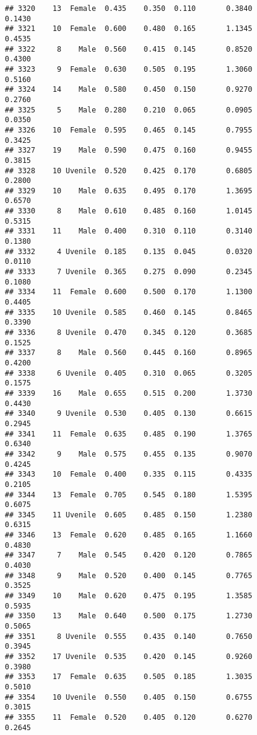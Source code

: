 \documentclass[
]{article}
\begin{document}
\begin{verbatim}
## 3320    13  Female  0.435    0.350  0.110       0.3840         0.1430
## 3321    10  Female  0.600    0.480  0.165       1.1345         0.4535
## 3322     8    Male  0.560    0.415  0.145       0.8520         0.4300
## 3323     9  Female  0.630    0.505  0.195       1.3060         0.5160
## 3324    14    Male  0.580    0.450  0.150       0.9270         0.2760
## 3325     5    Male  0.280    0.210  0.065       0.0905         0.0350
## 3326    10  Female  0.595    0.465  0.145       0.7955         0.3425
## 3327    19    Male  0.590    0.475  0.160       0.9455         0.3815
## 3328    10 Uvenile  0.520    0.425  0.170       0.6805         0.2800
## 3329    10    Male  0.635    0.495  0.170       1.3695         0.6570
## 3330     8    Male  0.610    0.485  0.160       1.0145         0.5315
## 3331    11    Male  0.400    0.310  0.110       0.3140         0.1380
## 3332     4 Uvenile  0.185    0.135  0.045       0.0320         0.0110
## 3333     7 Uvenile  0.365    0.275  0.090       0.2345         0.1080
## 3334    11  Female  0.600    0.500  0.170       1.1300         0.4405
## 3335    10 Uvenile  0.585    0.460  0.145       0.8465         0.3390
## 3336     8 Uvenile  0.470    0.345  0.120       0.3685         0.1525
## 3337     8    Male  0.560    0.445  0.160       0.8965         0.4200
## 3338     6 Uvenile  0.405    0.310  0.065       0.3205         0.1575
## 3339    16    Male  0.655    0.515  0.200       1.3730         0.4430
## 3340     9 Uvenile  0.530    0.405  0.130       0.6615         0.2945
## 3341    11  Female  0.635    0.485  0.190       1.3765         0.6340
## 3342     9    Male  0.575    0.455  0.135       0.9070         0.4245
## 3343    10  Female  0.400    0.335  0.115       0.4335         0.2105
## 3344    13  Female  0.705    0.545  0.180       1.5395         0.6075
## 3345    11 Uvenile  0.605    0.485  0.150       1.2380         0.6315
## 3346    13  Female  0.620    0.485  0.165       1.1660         0.4830
## 3347     7    Male  0.545    0.420  0.120       0.7865         0.4030
## 3348     9    Male  0.520    0.400  0.145       0.7765         0.3525
## 3349    10    Male  0.620    0.475  0.195       1.3585         0.5935
## 3350    13    Male  0.640    0.500  0.175       1.2730         0.5065
## 3351     8 Uvenile  0.555    0.435  0.140       0.7650         0.3945
## 3352    17 Uvenile  0.535    0.420  0.145       0.9260         0.3980
## 3353    17  Female  0.635    0.505  0.185       1.3035         0.5010
## 3354    10 Uvenile  0.550    0.405  0.150       0.6755         0.3015
## 3355    11  Female  0.520    0.405  0.120       0.6270         0.2645

\end{verbatim}
\end{document}
